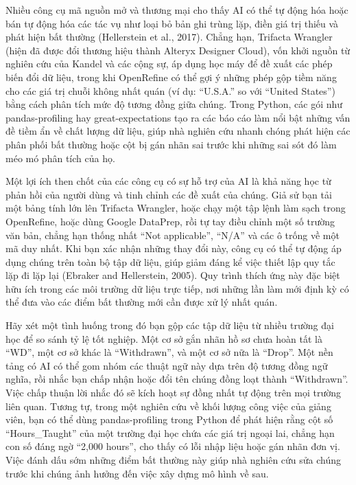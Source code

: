 Nhiều công cụ mã nguồn mở và thương mại cho thấy AI có thể tự động hóa hoặc bán tự động hóa các tác vụ như loại bỏ bản ghi trùng lặp, điền giá trị thiếu và phát hiện bất thường (Hellerstein et al., 2017). Chẳng hạn, Trifacta Wrangler (hiện đã được đổi thương hiệu thành Alteryx Designer Cloud), vốn khởi nguồn từ nghiên cứu của Kandel và các cộng sự, áp dụng học máy để đề xuất các phép biến đổi dữ liệu, trong khi OpenRefine có thể gợi ý những phép gộp tiềm năng cho các giá trị chuỗi không nhất quán (ví dụ: ``U.S.A.'' so với ``United States'') bằng cách phân tích mức độ tương đồng giữa chúng. Trong Python, các gói như pandas-profiling hay great-expectations tạo ra các báo cáo làm nổi bật những vấn đề tiềm ẩn về chất lượng dữ liệu, giúp nhà nghiên cứu nhanh chóng phát hiện các phân phối bất thường hoặc cột bị gán nhãn sai trước khi những sai sót đó làm méo mó phân tích của họ.

Một lợi ích then chốt của các công cụ có sự hỗ trợ của AI là khả năng học từ phản hồi của người dùng và tinh chỉnh các đề xuất của chúng. Giả sử bạn tải một bảng tính lớn lên Trifacta Wrangler, hoặc chạy một tập lệnh làm sạch trong OpenRefine, hoặc dùng Google DataPrep, rồi tự tay điều chỉnh một số trường văn bản, chẳng hạn thống nhất ``Not applicable'', ``N/A'' và các ô trống về một mã duy nhất. Khi bạn xác nhận những thay đổi này, công cụ có thể tự động áp dụng chúng trên toàn bộ tập dữ liệu, giúp giảm đáng kể việc thiết lập quy tắc lặp đi lặp lại (Ebraker and Hellerstein, 2005). Quy trình thích ứng này đặc biệt hữu ích trong các môi trường dữ liệu trực tiếp, nơi những lần làm mới định kỳ có thể đưa vào các điểm bất thường mới cần được xử lý nhất quán.

Hãy xét một tình huống trong đó bạn gộp các tập dữ liệu từ nhiều trường đại học để so sánh tỷ lệ tốt nghiệp. Một cơ sở gắn nhãn hồ sơ chưa hoàn tất là ``WD'', một cơ sở khác là ``Withdrawn'', và một cơ sở nữa là ``Drop''. Một nền tảng có AI có thể gom nhóm các thuật ngữ này dựa trên độ tương đồng ngữ nghĩa, rồi nhắc bạn chấp nhận hoặc đổi tên chúng đồng loạt thành ``Withdrawn''. Việc chấp thuận lời nhắc đó sẽ kích hoạt sự đồng nhất tự động trên mọi trường liên quan. Tương tự, trong một nghiên cứu về khối lượng công việc của giảng viên, bạn có thể dùng pandas-profiling trong Python để phát hiện rằng cột số ``Hours\_Taught'' của một trường đại học chứa các giá trị ngoại lai, chẳng hạn con số đáng ngờ ``2,000 hours'', cho thấy có lỗi nhập liệu hoặc gán nhãn đơn vị. Việc đánh dấu sớm những điểm bất thường này giúp nhà nghiên cứu sửa chúng trước khi chúng ảnh hưởng đến việc xây dựng mô hình về sau.


